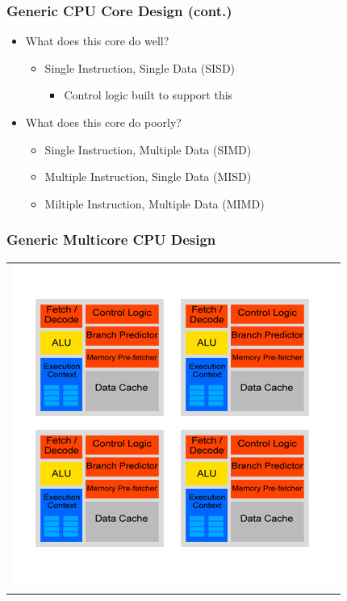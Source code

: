 \documentclass{beamer}
\begin{document}
\begin{frame}
	\frametitle{Generic CPU Core Design (cont.)}
	\begin{itemize}
		\item<1-> What does this core do well?
		\begin{itemize}
			\item<2-> Single Instruction, Single Data (SISD)
			\begin{itemize}
				\item<2-> Control logic built to support this
			\end{itemize}
		\end{itemize}
		\item<3-> What does this core do poorly?
		\begin{itemize}
			\item<4-> Single Instruction, Multiple Data (SIMD)
			\item<4-> Multiple Instruction, Single Data (MISD)
			\item<4-> Miltiple Instruction, Multiple Data (MIMD)
		\end{itemize}
	\end{itemize}
\end{frame}

\begin{frame}
	\frametitle{Generic Multicore CPU Design}
	\begin{tabular}{c}
		\includegraphics[width=.75\textwidth]{Multicore-CPU-design.jpg}
	\end{tabular}
\end{frame}
\end{document}

